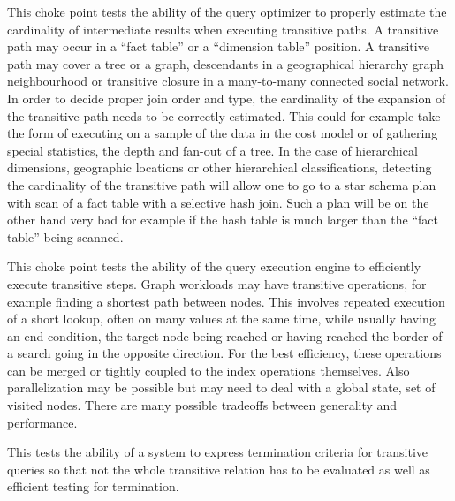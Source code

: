 This choke point tests the ability of the query optimizer to properly estimate the cardinality of intermediate results when executing transitive paths. A transitive path may occur in a ``fact table'' or a ``dimension table'' position.
A transitive path may cover a tree or a graph, \eg descendants in a geographical hierarchy \vs graph neighbourhood or transitive closure in a many-to-many connected social network.
In order to decide proper join order and type, the cardinality of the expansion of the transitive path needs to be correctly estimated.
This could for example take the form of executing on a sample of the data in the
cost model or of gathering special statistics, \eg the depth and fan-out of a tree. In the case of hierarchical dimensions,
\eg geographic locations or other hierarchical classifications, detecting the cardinality of the transitive path will allow one to go to a star schema plan with scan of a fact table with a selective hash join.
Such a plan will be on the other hand very bad for example if the hash table is much larger than the ``fact table'' being scanned.





This choke point tests the ability of the query execution engine to efficiently execute transitive steps. Graph workloads may have transitive operations, for example finding a shortest path between nodes.
This involves repeated execution of a short lookup, often on many values at the
same time, while usually having an end condition, \eg the target node being reached or having reached the border of a search going in the opposite direction.
For the best efficiency, these operations can be merged or tightly coupled to
the index operations themselves. Also parallelization may be possible but may
need to deal with a global state, \eg set of visited nodes.
There are many possible tradeoffs between generality and performance.





This tests the ability of a system to express termination criteria for transitive queries so that not the whole transitive relation has to be evaluated as well as efficient testing for termination.


